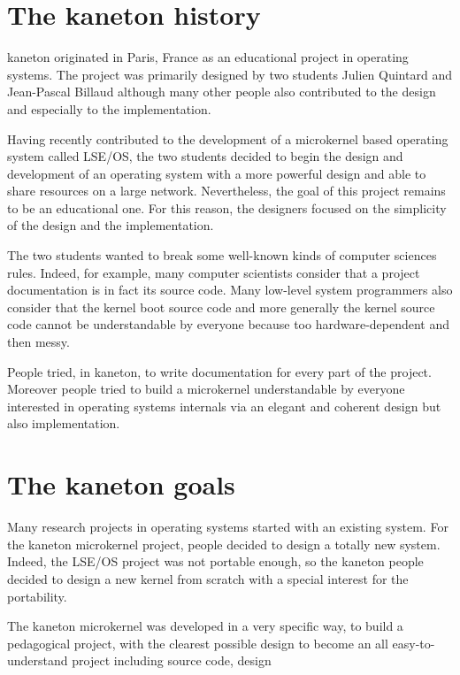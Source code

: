 \begin{multicols}{2}

%
%

\section{The kaneton history}

kaneton originated in Paris, France as an educational project in operating
systems. The project was primarily designed by two students Julien Quintard
and Jean-Pascal Billaud although many other people also contributed to
the design and especially to the implementation.

Having recently contributed to the development of a microkernel based
operating system called LSE/OS, the two students decided to begin the
design and development of an operating system with a more powerful design
and able to share resources on a large network. Nevertheless, the goal of
this project remains to be an educational one. For this reason, the
designers focused on the simplicity of the design and the implementation.

The two students wanted to break some well-known kinds of computer sciences
rules. Indeed, for example, many computer scientists consider that a
project documentation is in fact its source code. Many low-level system
programmers also consider that the kernel boot source code and more
generally the kernel source code cannot be understandable by everyone
because too hardware-dependent and then messy.

People tried, in kaneton, to write documentation for every part of the
project. Moreover people tried to build a microkernel understandable
by everyone interested in operating systems internals via an elegant
and coherent design but also implementation.

%
%

\section{The kaneton goals}

Many research projects in operating systems started with an existing system.
For the kaneton microkernel project, people decided to design a totally
new system. Indeed, the LSE/OS project was not portable enough, so the
kaneton people decided to design a new kernel from scratch with a
special interest for the portability.

The kaneton microkernel was developed in a very specific way, to build
a pedagogical project, with the clearest possible design to become an
all easy-to-understand project including source code, design \etc{}


\end{multicols}
